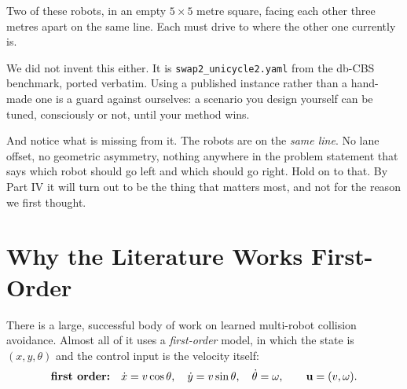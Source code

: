 \documentclass[11pt,a4paper]{article}
\newcommand{\code}[1]{\texttt{\small #1}}
\newcommand{\bu}{\mathbf{u}}
\begin{document}
Two of these robots, in an empty $5 \times 5$ metre square, facing each other three metres
apart on the same line. Each must drive to where the other one currently is.

\begin{center}
\end{center}

We did not invent this either. It is \code{swap2\_unicycle2.yaml} from the db-CBS
benchmark, ported verbatim. Using a published instance rather than a hand-made one is a
guard against ourselves: a scenario you design yourself can be tuned, consciously or not,
until your method wins.

And notice what is missing from it. The robots are on the \emph{same line}. No lane offset,
no geometric asymmetry, nothing anywhere in the problem statement that says which robot
should go left and which should go right. Hold on to that. By Part IV it will turn out to
be the thing that matters most, and not for the reason we first thought.

\section{Why the Literature Works First-Order}

There is a large, successful body of work on learned multi-robot collision avoidance. Almost
all of it uses a \emph{first-order} model, in which the state is $(x,y,\theta)$ and the
control input is the velocity itself:
\[
  \text{\textbf{first order:}}\quad \dot x = v\cos\theta,\quad \dot y = v\sin\theta,\quad
  \dot\theta=\omega, \qquad \bu = (v,\omega).
\]
\end{document}
